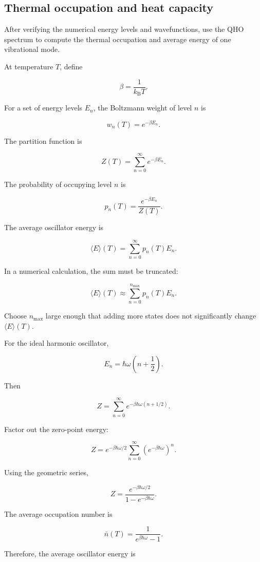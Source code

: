 \subsection{Thermal occupation and heat capacity}

After verifying the numerical energy levels and wavefunctions, use the QHO spectrum to compute the thermal occupation and average energy of one vibrational mode.

At temperature \(T\), define

\[
\beta
=
\frac{1}{k_{\mathrm B}T}.
\]

For a set of energy levels \(E_n\), the Boltzmann weight of level \(n\) is

\[
w_n(T)
=
e^{-\beta E_n}.
\]

The partition function is

\[
Z(T)
=
\sum_{n=0}^{\infty}
e^{-\beta E_n}.
\]

The probability of occupying level \(n\) is

\[
p_n(T)
=
\frac{
e^{-\beta E_n}
}{
Z(T)
}.
\]

The average oscillator energy is

\[
\langle E\rangle(T)
=
\sum_{n=0}^{\infty}
p_n(T)E_n.
\]

In a numerical calculation, the sum must be truncated:

\[
\langle E\rangle(T)
\approx
\sum_{n=0}^{n_{\max}}
p_n(T)E_n.
\]

Choose \(n_{\max}\) large enough that adding more states does not significantly change \(\langle E\rangle(T)\).

For the ideal harmonic oscillator,

\[
E_n
=
\hbar\omega
\left(
n+\frac{1}{2}
\right).
\]

Then

\[
Z
=
\sum_{n=0}^{\infty}
e^{-\beta\hbar\omega(n+1/2)}.
\]

Factor out the zero-point energy:

\[
Z
=
e^{-\beta\hbar\omega/2}
\sum_{n=0}^{\infty}
\left(
e^{-\beta\hbar\omega}
\right)^n.
\]

Using the geometric series,

\[
Z
=
\frac{
e^{-\beta\hbar\omega/2}
}{
1-e^{-\beta\hbar\omega}
}.
\]

The average occupation number is

\[
\bar{n}(T)
=
\frac{1}{
e^{\beta\hbar\omega}-1
}.
\]

Therefore, the average oscillator energy is

